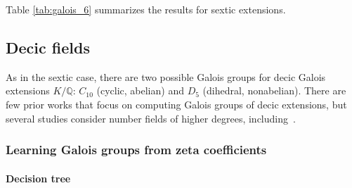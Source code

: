 \documentclass[letterpaper, 10pt]{article}
\newcommand{\1}{\mathds{1}}	%
\theoremstyle{definition}
\theoremstyle{remark}
\begin{document}
\begin{table}[h]
    \begin{center}
        \caption{Mean (left) and median (right) of polynomial coefficients of sextic extensions.}
        \label{tab:sextic_nonab_poly}
    \end{center}
\end{table}


Table \ref{tab:galois_6} summarizes the results for sextic extensions.


\subsection{Decic fields}

As in the sextic case, there are two possible Galois groups for decic Galois extensions \( K/\mathbb{Q} \): \( C_{10} \) (cyclic, abelian) and \( D_5 \) (dihedral, nonabelian).  
There are few prior works that focus on computing Galois groups of decic extensions, but several studies consider number fields of higher degrees, including~\cite{kluners2001database, fieker2014computation, cohen2007number}.


\subsubsection{Learning Galois groups from zeta coefficients}




\paragraph{Decision tree}
\end{document}
